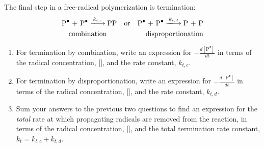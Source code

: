 \begin{activity}
\begin{ctqs}
	\question The final step in a free-radical polymerization is termination:
		\begin{align*}
			\text{\ce{P^.} + \ce{P^.}} \xlongrightarrow{k_{t,c}} \text{\ce{PP}} && \text{or} && \text{\ce{P^.} + \ce{P^.}} \xlongrightarrow{k_{t,d}} \text{P + P}\\
			\text{combination\hspace{0.5cm}} && && \text{disproportionation}
		\end{align*}
		
		\begin{enumerate}
			\item For termination by combination, write an expression for $-\frac{d[\text{P}^{\bullet}]}{dt}$ in terms of the radical concentration, [], and the rate constant, $k_{t,c}$.
			
				\begin{solution}[0.75in]\end{solution}
			
			\item For termination by disproportionation, write an expression for $-\frac{d[\text{P}^{\bullet}]}{dt}$ in terms of the radical concentration, [], and the rate constant, $k_{t,d}$.
			
				\begin{solution}[0.75in]\end{solution}
			
			\item Sum your answers to the previous two questions to find an expression for the \emph{total} rate at which propagating radicals are removed from the reaction, in terms of the radical concentration, [], and the total termination rate constant, $k_t = k_{t,c} + k_{t,d}$.
			
				\begin{solution}[0.75in]\end{solution}
				

\end{enumerate}
\end{ctqs}
\end{activity}
